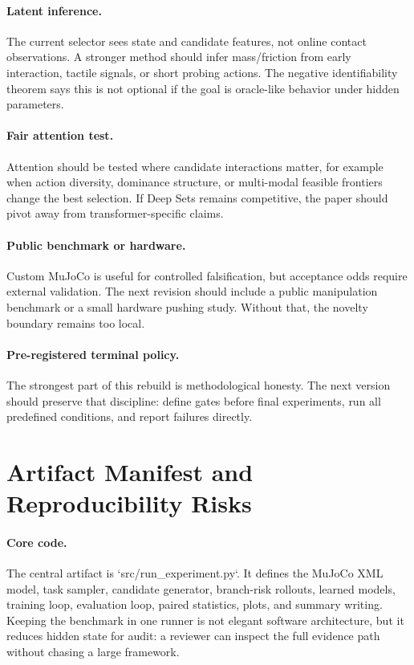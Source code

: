 \documentclass{article}
\begin{document}
\paragraph{Latent inference.}
The current selector sees state and candidate features, not online contact observations.  A stronger method should infer mass/friction from early interaction, tactile signals, or short probing actions.  The negative identifiability theorem says this is not optional if the goal is oracle-like behavior under hidden parameters.

\paragraph{Fair attention test.}
Attention should be tested where candidate interactions matter, for example when action diversity, dominance structure, or multi-modal feasible frontiers change the best selection.  If Deep Sets remains competitive, the paper should pivot away from transformer-specific claims.

\paragraph{Public benchmark or hardware.}
Custom MuJoCo is useful for controlled falsification, but acceptance odds require external validation.  The next revision should include a public manipulation benchmark or a small hardware pushing study.  Without that, the novelty boundary remains too local.

\paragraph{Pre-registered terminal policy.}
The strongest part of this rebuild is methodological honesty.  The next version should preserve that discipline: define gates before final experiments, run all predefined conditions, and report failures directly.

\section{Artifact Manifest and Reproducibility Risks}

\paragraph{Core code.}
The central artifact is `src/run\_experiment.py`.  It defines the MuJoCo XML model, task sampler, candidate generator, branch-risk rollouts, learned models, training loop, evaluation loop, paired statistics, plots, and summary writing.  Keeping the benchmark in one runner is not elegant software architecture, but it reduces hidden state for audit: a reviewer can inspect the full evidence path without chasing a large framework.
\end{document}
